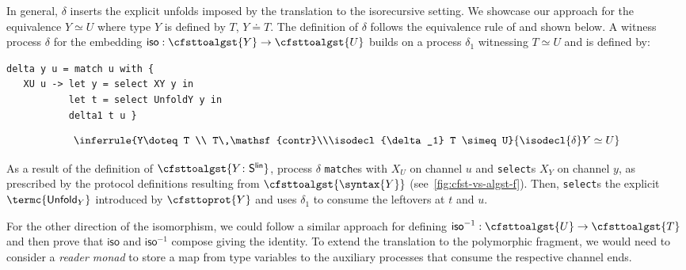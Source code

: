 In general, $\delta$ inserts the explicit unfolds imposed by the translation to the isorecursive setting.
We showcase our approach for the equivalence $Y \simeq U$ where type $Y$ is defined by $T$, $Y \doteq T$.
The definition of $\delta$ follows the equivalence rule of \citet{DBLP:journals/corr/abs-2203-12877}
and shown below.
%
A witness process $\delta$ for the embedding $\mathsf{iso} : \cfsttoalgst{Y} \rightarrow \cfsttoalgst{U}$  
builds on a process $\delta_1$ witnessing $T \simeq U$ and is defined by:

\begin{minipage}{0.6\textwidth}
\begin{lstlisting}
delta y u = match u with {
   XU u -> let y = select XY y in 
           let t = select UnfoldY y in
           delta1 t u }
\end{lstlisting}
\end{minipage}
\begin{minipage}{0.4\textwidth}
	$$\inferrule{Y\doteq T \\ T\,\mathsf{contr}\\\isodecl{\delta_1} T \simeq U}{\isodecl{\delta} Y \simeq U}$$
\end{minipage}

As a result of the definition of $\cfsttoalgst{Y\colon \mathsf{S^{lin}}}$, 
process $\delta$ \lstinline|match|es with $X_U$ on channel $u$ and \lstinline|select|s $X_Y$ on channel $y$, as prescribed by the
protocol definitions resulting from $\cfsttoalgst{\syntax{Y}}$ (see~\cref{fig:cfst-vs-algst-f}). Then, 
 \lstinline|select|s the explicit $\termc{\mathsf{Unfold}_Y}$ introduced by $\cfsttoprot{Y}$ and 
uses $\delta_1$ to consume the leftovers at $t$ and $u$.

For the
other direction of the isomorphism, we could follow a similar approach for defining 
$\mathsf{iso}^{-1} : \cfsttoalgst{U} \rightarrow \cfsttoalgst{T}$ 
and then prove that $\mathsf{iso}$ and $\mathsf{iso}^{-1}$ compose giving the identity.
To extend the translation to the polymorphic fragment, we would need to consider a 
\emph{reader monad} to store a map from type variables to the auxiliary processes
that consume the respective channel ends.
 

